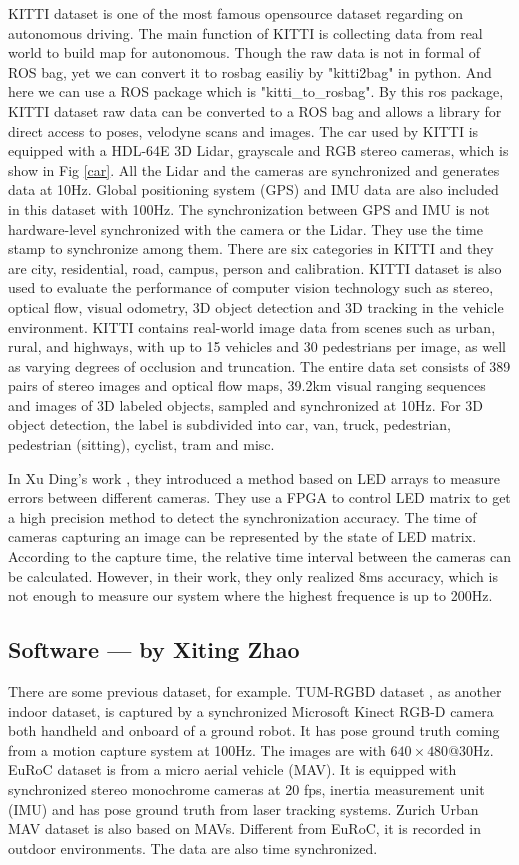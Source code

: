 \documentclass[conference]{IEEEtran}
\begin{document}
	KITTI dataset \cite{Geiger2013IJRR} is one of the most famous opensource dataset regarding on autonomous driving. The main function of KITTI is collecting data from real world to build map for autonomous. Though the raw data is not in formal of ROS bag, yet we can convert it to rosbag easiliy by "kitti2bag" in python. And here we can use a ROS package which is "kitti\_to\_rosbag". By this ros package, KITTI dataset raw data can be converted to a ROS bag and allows a library for direct access to poses, velodyne scans and images. The car used by KITTI is equipped with a HDL-64E 3D Lidar, grayscale and RGB stereo cameras, which is show in Fig \ref{car}. All the Lidar and the cameras are synchronized and generates data at 10Hz. Global positioning system (GPS) and IMU data are also included in this dataset with 100Hz. The synchronization between GPS and IMU is not hardware-level synchronized with the camera or the Lidar. They use the time stamp to synchronize among them. There are six categories in KITTI and they are city, residential, road, campus, person and calibration.	KITTI dataset is also used to evaluate the performance of computer vision technology such as stereo, optical flow, visual odometry, 3D object detection and 3D tracking in the vehicle environment. KITTI contains real-world image data from scenes such as urban, rural, and highways, with up to 15 vehicles and 30 pedestrians per image, as well as varying degrees of occlusion and truncation. The entire data set consists of 389 pairs of stereo images and optical flow maps, 39.2km visual ranging sequences and images of 3D labeled objects, sampled and synchronized at 10Hz. For 3D object detection, the label is subdivided into car, van, truck, pedestrian, pedestrian (sitting), cyclist, tram and misc.
	\par
	In Xu Ding's work \cite{8074435}, they introduced a method based on LED arrays to measure errors between different cameras. They use a FPGA to control LED matrix to get a high precision method to detect the synchronization accuracy. The time of cameras capturing an image can be represented by the state of LED matrix. According to the capture time, the relative time interval between the cameras can be calculated. However, in their work, they only realized 8ms accuracy, which is not enough to measure our system where the highest frequence is up to 200Hz.
	\subsection{Software --- by Xiting Zhao}
	There are some previous dataset, for example.
	TUM-RGBD dataset \cite{TUM-RGBD}, as another indoor dataset, is captured by a synchronized Microsoft Kinect RGB-D camera both handheld and onboard of a ground robot. It has pose ground truth coming from a motion capture system at 100Hz. The images are with $640\times 480@30$Hz. 
	EuRoC dataset\cite{EuRoC} is from a micro aerial vehicle (MAV). It is equipped with synchronized stereo monochrome cameras at 20 fps, inertia measurement unit (IMU) and has pose ground truth from laser tracking systems.
	Zurich Urban MAV dataset \cite{Zurich_Urban_MAV} is also based on MAVs. Different from EuRoC, it is recorded in outdoor environments. The data are also time synchronized.
	
\end{document}
